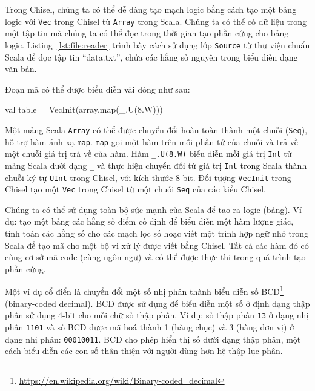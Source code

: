 \documentclass[%
    10pt,
    headinclude, footexclude,
    openright, %
    notitlepage,
    cleardoubleempty,
    headsepline,
    pointlessnumbers,
    bibtotoc, idxtotoc,
    ]{scrbook}
\newcommand{\code}[1]{{\small{\texttt{#1}}}}
\newcommand{\myref}[2]{\href{#1}{#2}}
\renewcommand{\myref}[2]{{#2}{\footnote{\url{#1}}}}
\begin{document}
Trong Chisel, chúng ta có thể dễ dàng tạo mạch logic bằng cách tạo một bảng logic với \code{Vec} trong Chisel từ \code{Array} trong Scala. Chúng ta có thể có dữ liệu trong một tập tin mà chúng ta có thể đọc trong thời gian tạo phần cứng cho bảng logic. Listing~\ref{lst:file:reader} trình bày cách sử dụng lớp \code {Source} từ thư viện chuẩn Scala để đọc tập tin ``data.txt'', chứa các hằng số nguyên trong biểu diễn dạng văn bản.

Đoạn mã có thể được biểu diễn vài dòng như sau:
\begin{chisel}
  val table = VecInit(array.map(_.U(8.W)))
\end{chisel}

\noindent Một mảng Scala \code{Array} có thể được chuyển đổi hoàn toàn thành một chuỗi (\code{Seq}), hỗ trợ hàm ánh xạ \code{map}. \code{map} gọi một hàm trên mỗi phần tử của chuỗi và trả về một chuỗi giá trị trả về của hàm. Hàm \code{\_.U(8.W)} biểu diễn mỗi giá trị \code{Int} từ mảng Scala dưới dạng \code{\_} và thực hiện chuyển đổi từ giá trị \code{Int} trong Scala thành chuỗi ký tự \code{UInt} trong Chisel, với kích thước 8-bit. Đối tượng \code{VecInit} trong Chisel tạo một \code{Vec} trong Chisel từ một chuỗi \code{Seq} của các kiểu Chisel. 



Chúng ta có thể sử dụng toàn bộ sức mạnh của Scala để tạo ra logic (bảng). Ví dụ: tạo một bảng các hằng số điểm cố định để biểu diễn một hàm lượng giác, tính toán các hằng số cho các mạch lọc số hoặc viết một trình hợp ngữ nhỏ trong Scala để tạo mã cho một bộ vi xử lý được viết bằng Chisel. Tất cả các hàm đó có cùng cơ sở mã code (cùng ngôn ngữ) và có thể được thực thi trong quá trình tạo phần cứng. 


Một ví dụ cổ điển là chuyển đổi một số nhị phân thành biểu diễn số \myref{https://en.wikipedia.org/wiki/Binary-coded_decimal}{BCD} (binary-coded decimal). BCD được sử dụng để biểu diễn một số ở định dạng thập phân sử dụng 4-bit cho mỗi chữ số thập phân. Ví dụ: số thập phân \code{13} ở dạng nhị phân \code{1101} và số BCD được mã hoá thành 1 (hàng chục) và 3 (hàng đơn vị) ở dạng nhị phân: \code{00010011}. BCD cho phép hiển thị số dưới dạng thập phân, một cách biểu diễn các con số thân thiện với người dùng hơn hệ thập lục phân.
\end{document}

